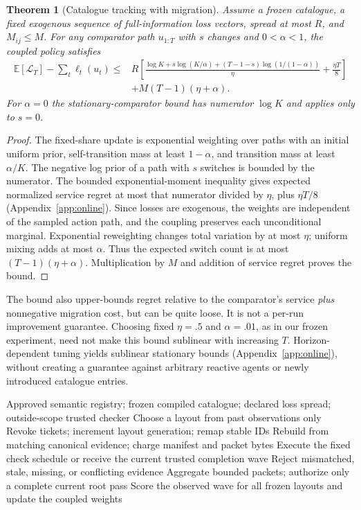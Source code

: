 \documentclass[11pt]{article}
\newtheorem{theorem}{Theorem}\newtheorem{proposition}[theorem]{Proposition}\newtheorem{lemma}[theorem]{Lemma}
\theoremstyle{definition}\newtheorem{definition}[theorem]{Definition}
\newcommand{\E}{\mathbb E}\newcommand{\Prb}{\mathbb P}\newcommand{\ind}{\mathbf 1}\newcommand{\R}{\mathcal R}
\begin{document}
\begin{theorem}[Catalogue tracking with migration]\label{thm:tracking}
Assume a frozen catalogue, a fixed exogenous sequence of full-information loss vectors, spread at most $R$, and $M_{ij}\le M$. For any comparator path $u_{1:T}$ with $s$ changes and $0<\alpha<1$, the coupled policy satisfies
\begin{align}
 \E[\mathcal L_T]-\sum_t\ell_t(u_t)
 \le{}& R\left[\frac{\log K+s\log(K/\alpha)+(T-1-s)\log(1/(1-\alpha))}{\eta}
             +\frac{\eta T}{8}\right]\nonumber\\
 &+M(T-1)(\eta+\alpha).\label{eq:tracking}
\end{align}
For $\alpha=0$ the stationary-comparator bound has numerator $\log K$ and applies only to $s=0$.
\end{theorem}
\begin{proof}
The fixed-share update is exponential weighting over paths with an initial uniform prior, self-transition mass at least $1-\alpha$, and transition mass at least $\alpha/K$. The negative log prior of a path with $s$ switches is bounded by the numerator. The bounded exponential-moment inequality gives expected normalized service regret at most that numerator divided by $\eta$, plus $\eta T/8$ (Appendix~\ref{app:online}). Since losses are exogenous, the weights are independent of the sampled action path, and the coupling preserves each unconditional marginal. Exponential reweighting changes total variation by at most $\eta$; uniform mixing adds at most $\alpha$. Thus the expected switch count is at most $(T-1)(\eta+\alpha)$. Multiplication by $M$ and addition of service regret proves the bound.\end{proof}
The bound also upper-bounds regret relative to the comparator's service \emph{plus} nonnegative migration cost, but can be quite loose. It is not a per-run improvement guarantee. Choosing fixed $\eta=.5$ and $\alpha=.01$, as in our frozen experiment, need not make this bound sublinear with increasing $T$. Horizon-dependent tuning yields sublinear stationary bounds (Appendix~\ref{app:online}), without creating a guarantee against arbitrary reactive agents or newly introduced catalogue entries.

\begin{algorithm}[t]
\caption{Adaptive layout control with an unchanged acceptance predicate}
\begin{algorithmic}[1]
\Require Approved semantic registry; frozen compiled catalogue; declared loss spread; outside-scope trusted checker
 \State Choose a layout from past observations only
   \State Revoke tickets; increment layout generation; remap stable IDs
   \State Rebuild from matching canonical evidence; charge manifest and packet bytes
 \EndIf
 \State Execute the fixed check schedule or receive the current trusted completion wave
 \State Reject mismatched, stale, missing, or conflicting evidence
 \State Aggregate bounded packets; authorize only a complete current root pass
 \State Score the observed wave for all frozen layouts and update the coupled weights
\EndFor
\end{algorithmic}
\end{algorithm}
\end{document}
